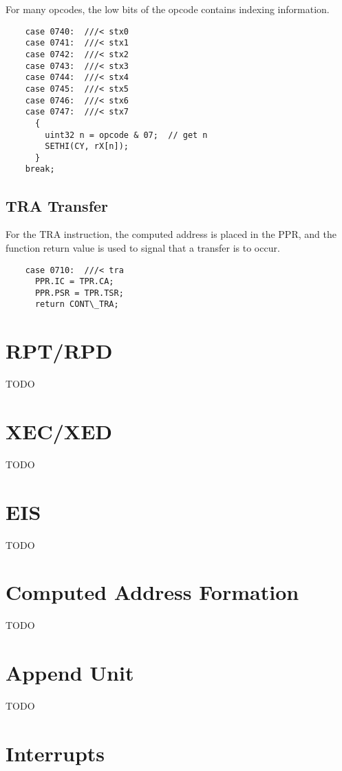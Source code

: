 \documentclass[notitlepage]{report}
\begin{document}
For many opcodes, the low bits of the opcode contains indexing 
information.

\begin{verbatim}
    case 0740:  ///< stx0
    case 0741:  ///< stx1
    case 0742:  ///< stx2
    case 0743:  ///< stx3
    case 0744:  ///< stx4
    case 0745:  ///< stx5
    case 0746:  ///< stx6
    case 0747:  ///< stx7
      {
        uint32 n = opcode & 07;  // get n
        SETHI(CY, rX[n]);
      }
    break;
\end{verbatim}

\subsection {TRA Transfer}

For the TRA instruction, the computed address is placed in the PPR, and the
function return value is used to signal that a transfer is to occur.

\begin{verbatim}
    case 0710:  ///< tra
      PPR.IC = TPR.CA;
      PPR.PSR = TPR.TSR;
      return CONT\_TRA;
\end{verbatim}

\section{RPT/RPD}

TODO

\section{XEC/XED}

TODO

\section{EIS}

TODO

\section{Computed Address Formation}

TODO

\section{Append Unit}

TODO

\section{Interrupts}
\end{document}
